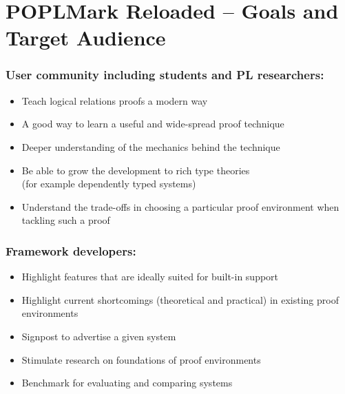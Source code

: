 \documentclass{beamer}
\begin{document}

\section{POPLMark Reloaded -- \newline Goals and Target Audience}
\begin{frame}\frametitle{User community including students and PL researchers:}%
\vspace{-3cm}


  \begin{itemize}
  \item Teach logical relations proofs a modern way 
  \item A good way to learn a useful and wide-spread proof technique
  \item Deeper understanding of the mechanics behind the technique
  \item Be able to grow the development to rich type theories \\
    (for example dependently typed systems)
  \item Understand the trade-offs in choosing a particular proof
    environment when tackling such a proof

  \end{itemize}





\end{frame}


\begin{frame}\frametitle{Framework developers:}%
\vspace{-3cm}
\begin{itemize}
\item Highlight features that are ideally suited for built-in support
\item Highlight current shortcomings (theoretical and practical) in existing proof environments
\item Signpost to advertise a given system
\item Stimulate research on foundations of proof environments
\item Benchmark for evaluating and comparing systems
\end{itemize}




\end{frame}
\end{document}
